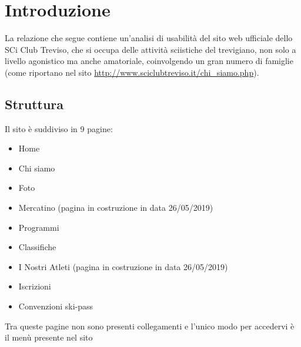 
\chapter{Introduzione}
\label{cap:analisi preliminare}

La relazione che segue contiene un'analisi di usabilità del sito web ufficiale dello SCi Club Treviso, che si occupa delle attività sciistiche del trevigiano, non solo a livello agonistico ma anche amatoriale, coinvolgendo un gran numero di famiglie (come riportano nel sito \url{http://www.sciclubtreviso.it/chi_siamo.php}).

\section{Struttura}

Il sito è suddiviso in 9 pagine: 
\begin{itemize}
    \item Home
    \item Chi siamo
    \item Foto
    \item Mercatino (pagina in costruzione in data 26/05/2019)
    \item Programmi
    \item Classifiche
    \item I Nostri Atleti (pagina in costruzione in data 26/05/2019)
    \item Iscrizioni
    \item Convenzioni ski-pass
\end{itemize}

Tra queste pagine non sono presenti collegamenti e l'unico modo per accedervi è il menù presente nel sito
